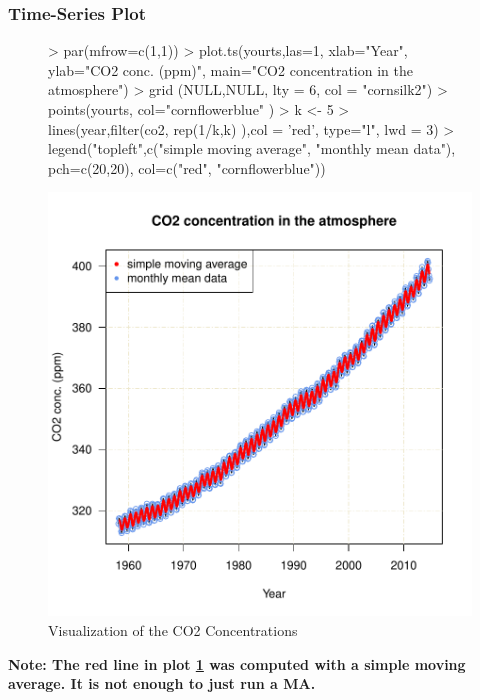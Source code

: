 \documentclass[11pt, a4paper]{article} %
\begin{document}
\subsubsection{Time-Series Plot}
\begin{figure}[H]
\centering
\begin{Schunk}
\begin{Sinput}
> par(mfrow=c(1,1))
> plot.ts(yourts,las=1, xlab="Year", ylab="CO2 conc. (ppm)", main="CO2 concentration in the atmosphere")
> grid (NULL,NULL, lty = 6, col = "cornsilk2")
> points(yourts, col="cornflowerblue" )
> k <- 5
> lines(year,filter(co2, rep(1/k,k) ),col = 'red', type="l", lwd = 3)
> legend("topleft",c("simple moving average", "monthly mean data"),
 pch=c(20,20), col=c("red", "cornflowerblue"))
\end{Sinput}
\end{Schunk}
\includegraphics{alles-fig1visualize}
\caption{Visualization of the CO2 Concentrations}
\label{fig1visualize}
\end{figure}
\noindent \textbf{Note: The red line in plot \ref{fig1visualize} was computed with a simple moving average. It is not enough to just run a MA.}\\
\end{document}
